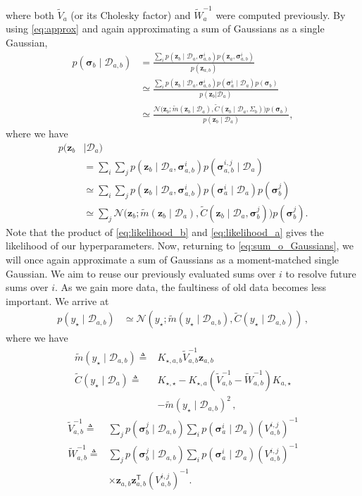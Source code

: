 \documentclass{article}
\newcommand{\given}{\ensuremath{\mid}}
\newcommand{\cm}[1]{\ensuremath{\mathcal{#1}}}
\newcommand{\bm}[1]{\ensuremath{\mathbf{#1}}}
\newcommand{\data}{\ensuremath{\cm{D}}}
\newcommand{\vect}[1]{\bm{#1}}
\newcommand{\vz}{\vect{z}}
\newcommand{\vs}{\vect{\sigma}}
\newcommand{\amean}[2]{\tilde{{m}}(#1 \given #2 )}
\newcommand{\acov}[2]{\tilde{{C}}(#1 \given #2 )}
\newcommand{\p}[2]{p(#1\given#2)}
\newcommand{\fPr}{p}
\newcommand{\Prob}[2]{\fPr(#1 \given #2 )}
\newcommand{\ps}[2]{p(#1\vert#2)}
\newcommand{\N}[3]{\cm{N}( #1;#2,#3 )}
\newcommand{\st}{_{\star}}
\newcommand{\tr}{\ensuremath{\mathsf{T}}}
\newcommand{\defequal}{\triangleq}
\begin{document}
where both $\tilde{V}_a$ (or its Cholesky factor) and
$\tilde{W}_a^{-1}$ were computed previously. By using
\eqref{eq:approx} and again approximating a sum of Gaussians as a
single Gaussian,
\begin{align*}
\Prob{\vs_b}{\data_{a,b}} & = \frac{\sum_i \p{\vz_b}{\data_a,\vs^i_{a,b}}p(\vz_a,\vs^i_{a,b})}{p(\vz_{a,b})}\nonumber\\
& \simeq \frac{\sum_i \p{\vz_b}{\data_a,\vs^i_{a,b}}\fPr(\vs_a^i\mid{\data_a})\fPr(\vs_{b})}{\ps{\vz_{b}}{\data_a}}\nonumber\\
& \simeq \frac{\cm{N}\bigl(\vz_b; \amean{\vz_b}{\data_a}, \acov{\vz_b}{\data_a, \Sigma_b}\bigr) \fPr(\vs_b)}{\p{\vz_{b}}{\data_a}},%
\end{align*}
where we have
\begin{align}
p(\vz_{b} &\given \data_a)\nonumber\\
& = \sum_i \sum_j \p{\vz_b}{\data_a,\vs^i_{a,b}}\Prob{\vs^{i,j}_{a,b}}{\data_a}\nonumber\\
& \simeq \sum_i \sum_j \p{\vz_b}{\data_a,\vs^i_{a,b}}\Prob{\vs_a^i}{\data_a}\fPr(\vs_{b}^j)\nonumber\\
& \simeq \sum_j \cm{N}\bigl(\vz_b; \amean{\vz_b}{\data_a}, \acov{\vz_b}{\data_a, \vs_b^j}\bigr) \fPr(\vs_b^j).\label{eq:likelihood_b}
\end{align}
Note that the product of \eqref{eq:likelihood_b} and
\eqref{eq:likelihood_a} gives the likelihood of our hyperparameters. Now, returning to \eqref{eq:sum_o_Gaussians}, we will once again
approximate a sum of Gaussians as a moment-matched single
Gaussian. We aim to reuse our previously evaluated sums over
$i$ to resolve future sums over $i$. As we gain more data, the
faultiness of old data becomes less important. We arrive at
\begin{align}
\p{y\st}{\data_{a,b}} & \simeq \N{y\st}{\amean{y\st}{\data_{a,b}}}{\acov{y\st}{\data_{a,b}}}\,,\label{eq:pyab}
\end{align}
where we have
\begin{align*}
\amean{y\st}{\data_{a,b}} \defequal {}&  K_{\star,a,b} \tilde{V}_{a,b}^{-1} \vz_{a,b}%
\\
\acov{y\st}{\data_{a}}
\defequal {} & K_{\star,\star} - K_{\star,a}(\tilde{V}_{a,b}^{-1}-\tilde{W}_{a,b}^{-1})K_{a,\star} {} \nonumber
\\
& - \amean{y\st}{\data_{a,b}}^2 \,,%
\end{align*}
\vspace{-0.8cm}
\begin{align*}
\tilde{V}^{-1}_{a,b} \defequal {} &
\sum_{j} \Prob{\vs^j_{b}}{\data_{a,b}}\sum_i \Prob{\vs^i_{a}}{\data_{a}} (V_{a,b}^{i,j})^{-1} \\
\tilde{W}^{-1}_{a,b} \defequal {} &
\sum_{j} \Prob{\vs^j_{b}}{\data_{a,b}}\sum_i \Prob{\vs^i_{a}}{\data_{a}} (V_{a,b}^{i,j})^{-1}  
\\
& \times \vz_{a,b}^{\phantom{\tr}} \vz_{a,b}^\tr (V_{a,b}^{i,j})^{-1}.
\end{align*}
\end{document}
